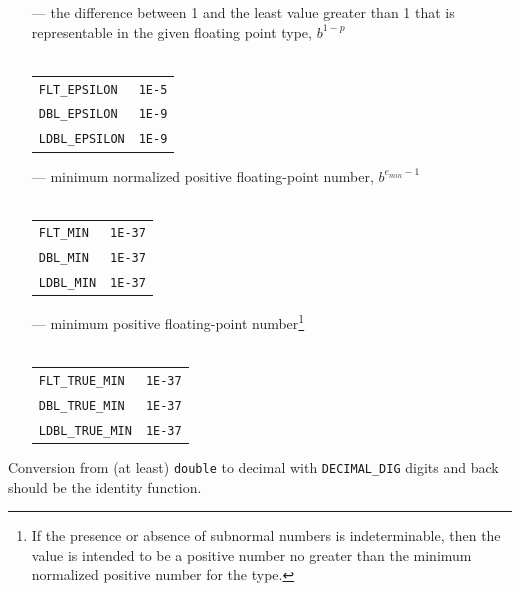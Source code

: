\begin{itemize}
\item[---] the difference between 1 and the least value greater than 1 that is
  representable in the given floating point type, $b^{1-p}$\\\\
\begin{tabular}{lr}
\texttt{FLT\_EPSILON}&\hfil\hspace*{2cm}\texttt{1E-5}\\
\texttt{DBL\_EPSILON}&\hfil\hspace*{2cm}\texttt{1E-9}\\
\texttt{LDBL\_EPSILON}&\hfil\hspace*{2cm}\texttt{1E-9}
\end{tabular}
\item[---] minimum normalized positive floating-point number,
  $b^{e_{min}-1}$\\\\
\begin{tabular}{lr}
\texttt{FLT\_MIN}&\hfil\hspace*{2cm}\texttt{1E-37}\\
\texttt{DBL\_MIN}&\hfil\hspace*{2cm}\texttt{1E-37}\\
\texttt{LDBL\_MIN}&\hfil\hspace*{2cm}\texttt{1E-37}
\end{tabular}
\item[---] minimum positive floating-point number\footnote{If the presence or
    absence of subnormal numbers is indeterminable, then the value is intended
    to be a positive number no greater than the minimum normalized positive
    number for the type.}\\\\
\begin{tabular}{lr}
\texttt{FLT\_TRUE\_MIN}&\hfil\hspace*{2cm}\texttt{1E-37}\\
\texttt{DBL\_TRUE\_MIN}&\hfil\hspace*{2cm}\texttt{1E-37}\\
\texttt{LDBL\_TRUE\_MIN}&\hfil\hspace*{2cm}\texttt{1E-37}
\end{tabular}
\end{itemize}

Conversion from (at least) \texttt{double} to decimal with
\texttt{DECIMAL\_DIG} digits and back should be the identity function.

